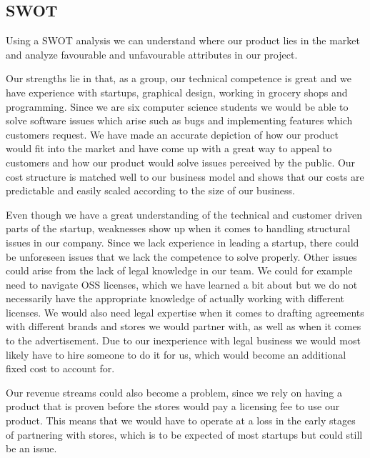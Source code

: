 \documentclass[titlepage]{article}
\begin{document}
\subsection{SWOT}

Using a SWOT analysis we can understand where our product lies in the market and analyze favourable and unfavourable attributes in our project.

Our strengths lie in that, as a group, our technical competence is great and we have experience with startups, graphical design, working in grocery shops and programming. Since we are six computer science students we would be able to solve software issues which arise such as bugs and implementing features which customers request. We have made an accurate depiction of how our product would fit into the market and have come up with a great way to appeal to customers and how our product would solve issues perceived by the public. Our cost structure is matched well to our business model and shows that our costs are predictable and easily scaled according to the size of our business. 

Even though we have a great understanding of the technical and customer driven parts of the startup, weaknesses show up when it comes to handling structural issues in our company. Since we lack experience in leading a startup, there could be unforeseen issues that we lack the competence to solve properly. Other issues could arise from the lack of legal knowledge in our team. We could for example need to navigate OSS licenses, which we have learned a bit about but we do not necessarily have the appropriate knowledge of actually working with different licenses. We would also need legal expertise when it comes to drafting agreements with different brands and stores we would partner with, as well as when it comes to the advertisement. Due to our inexperience with legal business we would most likely have to hire someone to do it for us, which would become an additional fixed cost to account for.

Our revenue streams could also become a problem, since we rely on having a product that is proven before the stores would pay a licensing fee to use our product. This means that we would have to operate at a loss in the early stages of partnering with stores, which is to be expected of most startups but could still be an issue.
\end{document}
